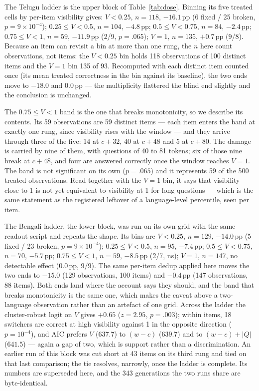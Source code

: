 \documentclass{article}
\begin{document}
The Telugu ladder is the upper block of Table~\ref{tab:dose}. Binning its
five treated cells by per-item visibility gives: $V<0.25$, $n{=}118$,
$-16.1$\,pp (6 fixed / 25 broken, $p{=}9\times10^{-4}$);
$0.25 \le V < 0.5$, $n{=}104$, $-4.8$\,pp; $0.5 \le V < 0.75$, $n{=}84$,
$-2.4$\,pp; $0.75 \le V < 1$, $n{=}59$, $-11.9$\,pp (2/9, $p{=}.065$);
$V{=}1$, $n{=}135$, $+0.7$\,pp (9/8). Because an item can revisit a bin
at more than one rung, the $n$ here count observations, not items: the
$V{<}0.25$ bin holds 118 observations of 100 distinct items and the
$V{=}1$ bin 135 of 93. Recomputed with each distinct item counted once
(its mean treated correctness in the bin against its baseline), the two
ends move to $-18.0$ and $0.0$\,pp --- the multiplicity flattered the
blind end slightly and the conclusion is unchanged.

The $0.75\le V<1$ band is the one that breaks monotonicity, so we
describe its contents. Its 59 observations are 59 distinct items --- each
item enters the band at exactly one rung, since visibility rises with the
window --- and they arrive through three of the five: 14 at $c{+}32$, 40
at $c{+}48$ and 5 at $c{+}80$. The damage is carried by nine of them,
with questions of 40 to 81 tokens; six of those nine break at $c{+}48$,
and four are answered correctly once the window reaches $V{=}1$. The band
is not significant on its own ($p{=}.065$) and it represents 59 of the 500
treated observations. Read together with the
$V{=}1$ bin, it says that visibility close to 1 is not yet equivalent to
visibility at 1 for long questions --- which is the same statement as the
registered leftover of a language-level percentile, seen per item.

The Bengali ladder, the lower block, was run on its own grid with the same
readout script and repeats the shape. Its bins are $V<0.25$, $n{=}129$,
$-14.0$\,pp (5 fixed / 23 broken, $p{=}9\times10^{-4}$);
$0.25 \le V < 0.5$, $n{=}95$, $-7.4$\,pp; $0.5 \le V < 0.75$, $n{=}70$,
$-5.7$\,pp; $0.75 \le V < 1$, $n{=}59$, $-8.5$\,pp (2/7, ns); $V{=}1$,
$n{=}147$, no detectable effect ($0.0$\,pp, 9/9). The same per-item
dedup applied here moves the two ends to $-15.0$ (129 observations, 100
items) and $-0.4$\,pp (147 observations, 88 items). Both ends land where the account says they
should, and the band that breaks monotonicity is the same one, which
makes the caveat above a two-language observation rather than an artefact
of one grid. Across the ladder the cluster-robust logit on $V$ gives
$+0.65$ ($z{=}2.95$, $p{=}.003$); within items, 18 switchers are correct
at high visibility against 1 in the opposite direction ($p{=}10^{-4}$),
and AIC prefers $V$
($637.7$) to $(w{-}c)$ ($639.7$) and to $(w{-}c)+|Q|$ ($641.5$) --- again
a gap of two, which is support rather than a discrimination. An earlier
run of this block was cut short at 43 items on its third rung and tied on
that last comparison; the tie resolves, narrowly, once the ladder is
complete. Its numbers are superseded here, and the 343 generations the
two runs share are byte-identical.
\end{document}

